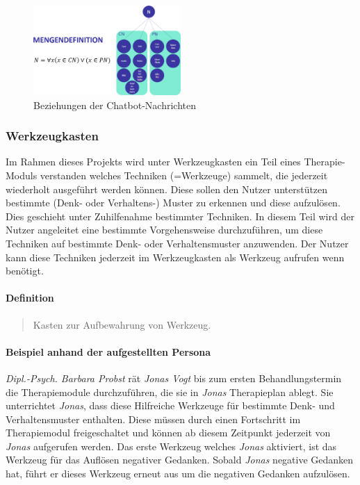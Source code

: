 \begin{figure}[h]
\centering
\includegraphics[width=0.5\textwidth]{pictures/nachrichtdef}
\caption{Beziehungen der Chatbot-Nachrichten}
\label{therapiedef}
\end{figure}

\subsubsection{Werkzeugkasten}
Im Rahmen dieses Projekts wird unter Werkzeugkasten ein Teil eines Therapie-Moduls verstanden welches Techniken (=Werkzeuge) sammelt, die jederzeit wiederholt ausgeführt werden können. Diese sollen den Nutzer unterstützen bestimmte (Denk- oder Verhaltens-) Muster zu erkennen und diese aufzulösen. Dies geschieht unter Zuhilfenahme bestimmter Techniken. In diesem Teil wird der Nutzer angeleitet eine bestimmte Vorgehensweise durchzuführen, um diese Techniken auf bestimmte Denk- oder Verhaltensmuster anzuwenden. Der Nutzer kann diese Techniken jederzeit im Werkzeugkasten als Werkzeug aufrufen wenn benötigt.

\paragraph{Definition}
\begin{quote}
Kasten zur Aufbewahrung von Werkzeug. \cite{DudenWer23:online}
\end{quote}

\paragraph{Beispiel anhand der aufgestellten Persona}
\emph{Dipl.-Psych. Barbara Probst} rät \emph{Jonas Vogt} bis zum ersten Behandlungstermin die Therapiemodule durchzuführen, die sie in \emph{Jonas} Therapieplan ablegt. Sie unterrichtet \emph{Jonas}, dass diese Hilfreiche Werkzeuge für bestimmte Denk- und Verhaltensmuster enthalten. Diese müssen durch einen Fortschritt im Therapiemodul freigeschaltet und können ab diesem Zeitpunkt jederzeit von \emph{Jonas} aufgerufen werden. Das erste Werkzeug welches \emph{Jonas} aktiviert, ist das Werkzeug für das Auflösen negativer Gedanken. Sobald \emph{Jonas} negative Gedanken hat, führt er dieses Werkzeug erneut aus um die negativen Gedanken aufzulösen.

